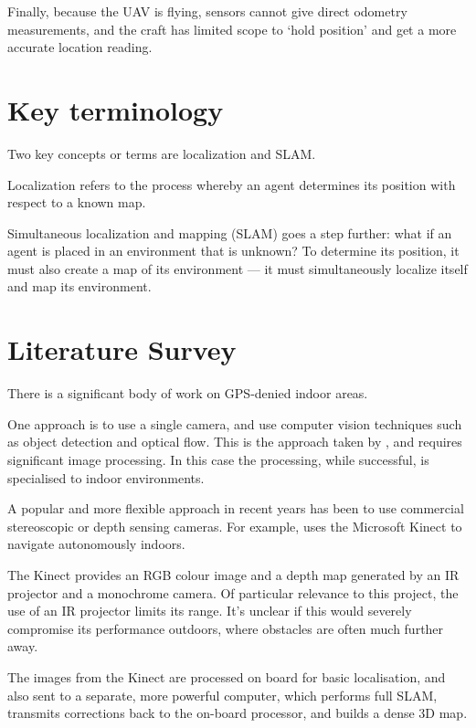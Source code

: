 \documentclass[12pt,oneside,a4paper,draft]{book}
\begin{document}
Finally, because the UAV is flying, sensors cannot give direct
odometry measurements, and the craft has limited scope to `hold
position' and get a more accurate location reading.

\section{Key terminology}
\label{sec:key-terminology}

Two key concepts or terms are localization and SLAM.

Localization refers to the process whereby an agent
determines its position with respect to a known map.

Simultaneous localization and mapping (SLAM) goes a step further: what
if an agent is placed in an environment that is unknown? To determine
its position, it must also create a map of its environment --- it must
simultaneously localize itself and map its environment.

\section{Literature Survey}
\label{sec:litsurvey}

There is a significant body of work on GPS-denied indoor areas.

One approach is to use a single camera, and use computer vision
techniques such as object detection and optical flow. This is the
approach taken by \cite{5152680}, and requires significant image
processing. In this case the processing, while successful, is
specialised to indoor environments.

A popular and more flexible approach in recent years has been to use
commercial stereoscopic or depth sensing cameras. For example,
\cite{huang2011visual} uses the Microsoft Kinect to navigate
autonomously indoors.

The Kinect provides an RGB colour image and a depth map generated by
an IR projector and a monochrome camera. Of particular relevance to
this project, the use of an IR projector limits its range. It's
unclear if this would severely compromise its performance outdoors,
where obstacles are often much further away.

The images from the Kinect are processed on board for basic
localisation, and also sent to a separate, more powerful computer,
which performs full SLAM, transmits corrections back to the on-board
processor, and builds a dense 3D map.
\end{document}
